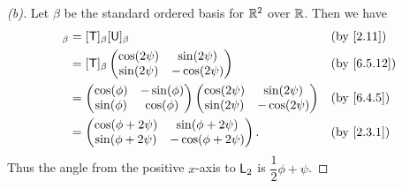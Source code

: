 \begin{proof}[(b)]
  Let \(\beta\) be the standard ordered basis for \(\mathbb{R}^2\) over \(\mathbb{R}\).
  Then we have
  \begin{align*}
    [\T \U]_{\beta} & = [\T]_{\beta} [\U]_{\beta}                   &  & \by{2.11} \\
                    & = [\T]_{\beta} \begin{pmatrix}
                                       \cos(2 \psi) & \sin(2 \psi)  \\
                                       \sin(2 \psi) & -\cos(2 \psi)
                                     \end{pmatrix}               &  & \by{6.5.12}  \\
                    & = \begin{pmatrix}
                          \cos(\phi) & -\sin(\phi) \\
                          \sin(\phi) & \cos(\phi)
                        \end{pmatrix} \begin{pmatrix}
                                        \cos(2 \psi) & \sin(2 \psi)  \\
                                        \sin(2 \psi) & -\cos(2 \psi)
                                      \end{pmatrix}               &  & \by{6.4.5}  \\
                    & = \begin{pmatrix}
                          \cos(\phi + 2 \psi) & \sin(\phi + 2 \psi)  \\
                          \sin(\phi + 2 \psi) & -\cos(\phi + 2 \psi)
                        \end{pmatrix}. &  & \by{2.3.1}
  \end{align*}
  Thus the angle from the positive \(x\)-axis to \(\mathsf{L}_2\) is \(\dfrac{1}{2} \phi + \psi\).
\end{proof}

